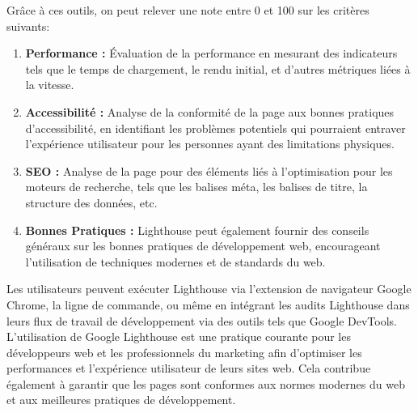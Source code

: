 \documentclass[12pt, a4paper]{report}
\begin{document}
Grâce à ces outils, on peut relever une note entre 0 et 100 sur les critères suivants:
\begin{enumerate}
    \item \textbf{Performance :} Évaluation de la performance en mesurant des indicateurs tels que le temps de chargement, le rendu initial, et d'autres métriques liées à la vitesse.
    
    \item \textbf{Accessibilité :} Analyse de la conformité de la page aux bonnes pratiques d'accessibilité, en identifiant les problèmes potentiels qui pourraient entraver l'expérience utilisateur pour les personnes ayant des limitations physiques.
    
    \item \textbf{SEO :} Analyse de la page pour des éléments liés à l'optimisation pour les moteurs de recherche, tels que les balises méta, les balises de titre, la structure des données, etc.
    
    \item \textbf{Bonnes Pratiques :} Lighthouse peut également fournir des conseils généraux sur les bonnes pratiques de développement web, encourageant l'utilisation de techniques modernes et de standards du web.
\end{enumerate}

Les utilisateurs peuvent exécuter Lighthouse via l'extension de navigateur Google Chrome, la ligne de commande, ou même en intégrant les audits Lighthouse dans leurs flux de travail de développement via des outils tels que Google DevTools.\\

L'utilisation de Google Lighthouse est une pratique courante pour les développeurs web et les professionnels du marketing afin d'optimiser les performances et l'expérience utilisateur de leurs sites web. Cela contribue également à garantir que les pages sont conformes aux normes modernes du web et aux meilleures pratiques de développement.


\end{document}
